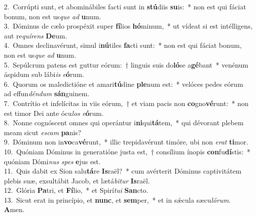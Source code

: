 {2.~}Corrúpti sunt, et abominábiles facti sunt in \textbf{stú}diis \textbf{su}is:~* non est qui fáciat bonum, non est us\textit{que} \textit{ad} \textbf{u}num.\\
{3.~}Dóminus de cælo prospéxit super \textbf{fí}lios \textbf{hó}minum,~* ut vídeat si est intélligens, aut re\textit{quí}\textit{rens} \textbf{De}um.\\
{4.~}Omnes declinavérunt, simul i\textbf{nú}tiles \textbf{fa}cti sunt:~* non est qui fáciat bonum, non est us\textit{que} \textit{ad} \textbf{u}num.\\
{5.~}Sepúlcrum patens est guttur eórum:~† linguis suis do\textbf{ló}se a\textbf{gé}bant~* venénum áspidum sub lábi\textit{is} \textit{e}\textbf{ó}rum.\\
{6.~}Quorum os maledictióne et amari\textbf{tú}dine \textbf{ple}num est:~* velóces pedes eórum ad effun\textit{dén}\textit{dum} \textbf{sán}guinem.\\
{7.~}Contrítio et infelícitas in viis eórum,~† et viam pacis non \textbf{co}gno\textbf{vé}runt:~* non est timor Dei ante ócu\textit{los} \textit{e}\textbf{ó}rum.\\
{8.~}Nonne cognóscent omnes qui operántur i\textbf{ni}qui\textbf{tá}tem,~* qui dévorant plebem meam sicut \textit{e}\textit{scam} \textbf{pa}nis?\\
{9.~}Dóminum non in\textbf{vo}ca\textbf{vé}runt,~* illic trepidavérunt timóre, ubi non \textit{e}\textit{rat} \textbf{ti}mor.\\
{10.~}Quóniam Dóminus in generatióne justa est,~† consílium ínopis \textbf{con}fu\textbf{dí}stis:~* quóniam Dómi\textit{nus} \textit{spes} \textbf{e}jus est.\\
{11.~}Quis dabit ex Sion salu\textbf{tá}re \textbf{Is}raël?~* cum avérterit Dóminus captivitátem plebis suæ, exsultábit Jacob, et lætá\textit{bi}\textit{tur} \textbf{Is}raël.\\
{12.~}Glória \textbf{Pa}tri, et \textbf{Fí}lio,~* et Spirí\textit{tu}\textit{i} \textbf{San}cto.\\
{13.~}Sicut erat in princípio, et \textbf{nunc}, et \textbf{sem}per,~* et in sǽcula sæcu\textit{ló}\textit{rum}. \textbf{A}men.\\
